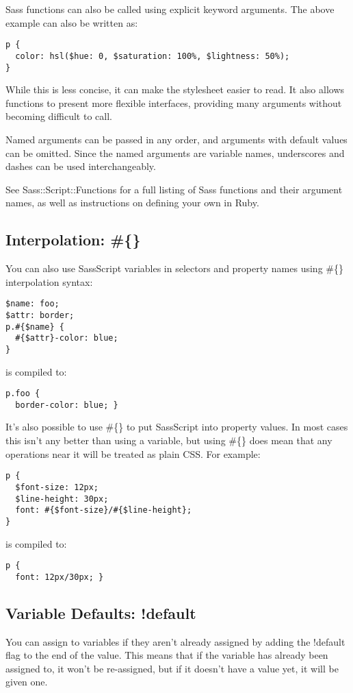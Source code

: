 \documentclass[10pt]{article}
\begin{document}
 Sass functions can also be called using explicit keyword arguments. The above example can also be written as:
\begin{verbatim}
p {
  color: hsl($hue: 0, $saturation: 100%, $lightness: 50%);
}
\end{verbatim}


 While this is less concise, it can make the stylesheet easier to read. It also allows functions to present more flexible interfaces, providing many arguments without becoming difficult to call.


 Named arguments can be passed in any order, and arguments with default values can be omitted. Since the named arguments are variable names, underscores and dashes can be used interchangeably.


 See Sass::Script::Functions for a full listing of Sass functions and their argument names, as well as instructions on defining your own in Ruby.
\subsection{Interpolation: \#\{\}}


 You can also use SassScript variables in selectors and property names using \#\{\} interpolation syntax:
\begin{verbatim}
$name: foo;
$attr: border;
p.#{$name} {
  #{$attr}-color: blue;
}
\end{verbatim}


 is compiled to:
\begin{verbatim}
p.foo {
  border-color: blue; }
\end{verbatim}


 It’s also possible to use \#\{\} to put SassScript into property values. In most cases this isn’t any better than using a variable, but using \#\{\} does mean that any operations near it will be treated as plain CSS. For example:
\begin{verbatim}
p {
  $font-size: 12px;
  $line-height: 30px;
  font: #{$font-size}/#{$line-height};
}
\end{verbatim}


 is compiled to:
\begin{verbatim}
p {
  font: 12px/30px; }
\end{verbatim}
\subsection{Variable Defaults: !default}


 You can assign to variables if they aren’t already assigned by adding the !default flag to the end of the value. This means that if the variable has already been assigned to, it won’t be re-assigned, but if it doesn’t have a value yet, it will be given one.
\end{document}
